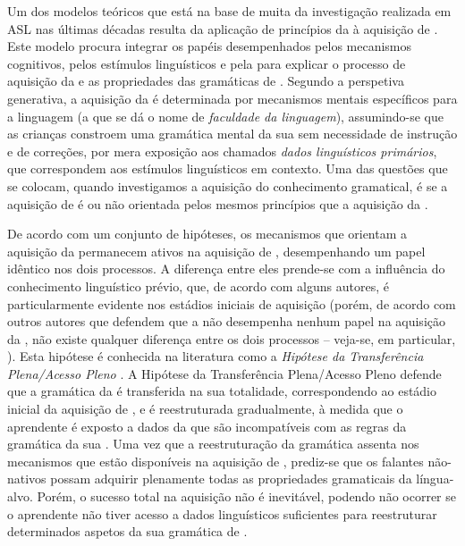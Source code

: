 \documentclass[output=paper]{LSP/langsci}
\begin{document}
Um dos modelos teóricos que está na base de muita da investigação realizada em ASL nas últimas décadas resulta da aplicação de princípios da  à aquisição de . Este modelo procura integrar os papéis desempenhados pelos mecanismos cognitivos, pelos estímulos linguísticos e pela  para explicar o processo de aquisição da  e as propriedades das gramáticas de . Segundo a perspetiva generativa, a aquisição da  é determinada por mecanismos mentais específicos para a linguagem (a que se dá o nome de \textit{faculdade da linguagem}), assumindo-se que as crianças constroem uma gramática mental da sua  sem necessidade de instrução e de correções, por mera exposição aos chamados \textit{dados linguísticos primários}, que correspondem aos estímulos linguísticos em contexto. Uma das questões que se colocam, quando investigamos a aquisição do conhecimento gramatical, é se a aquisição de  é ou não orientada pelos mesmos princípios que a aquisição da . 

De acordo com um conjunto de hipóteses, os mecanismos que orientam a aquisição da  permanecem ativos na aquisição de , desempenhando um papel idêntico nos dois processos. A diferença entre eles prende-se com a influência do conhecimento linguístico prévio, que, de acordo com alguns autores, é particularmente evidente nos estádios iniciais de aquisição (porém, de acordo com outros autores que defendem que a  não desempenha nenhum papel na aquisição da , não existe qualquer diferença entre os dois processos – veja-se, em particular, \citealt{epstein_etal1996}). Esta hipótese é conhecida na literatura como a \textit{Hipótese da Transferência Plena/Acesso Pleno} \citep{schwartzsprouse1996}. A Hipótese da Transferência Plena/Acesso Pleno defende que a gramática da  é transferida na sua totalidade, correspondendo ao estádio inicial da aquisição de , e é reestruturada gradualmente, à medida que o aprendente é exposto a dados da  que são incompatíveis com as regras da gramática da sua . Uma vez que a reestruturação da gramática assenta nos mecanismos que estão disponíveis na aquisição de , prediz-se que os falantes não-nativos possam adquirir plenamente todas as propriedades gramaticais da língua-alvo. Porém, o sucesso total na aquisição não é inevitável, podendo não ocorrer se o aprendente não tiver acesso a dados linguísticos suficientes para reestruturar determinados aspetos da sua gramática de .
\end{document}
